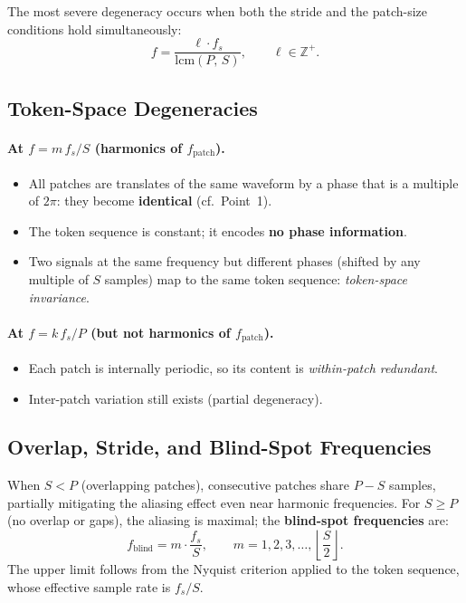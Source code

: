 The most severe degeneracy occurs when both the stride and the patch-size conditions hold
simultaneously:
\begin{equation}
    f = \frac{\ell \cdot f_s}{\mathrm{lcm}(P,\, S)},
    \qquad \ell \in \mathbb{Z}^+.
\end{equation}

\subsection{Token-Space Degeneracies}

\paragraph{At $f = m\,f_s/S$ (harmonics of $f_{\mathrm{patch}}$).}
\begin{itemize}
    \item All patches are translates of the same waveform by a phase that is a multiple of
          $2\pi$: they become \textbf{identical} (cf.\ Point~1).
    \item The token sequence is constant; it encodes \textbf{no phase information}.
    \item Two signals at the same frequency but different phases (shifted by any multiple of
          $S$ samples) map to the same token sequence: \emph{token-space invariance}.
\end{itemize}

\paragraph{At $f = k\,f_s/P$ (but not harmonics of $f_{\mathrm{patch}}$).}
\begin{itemize}
    \item Each patch is internally periodic, so its content is \emph{within-patch redundant}.
    \item Inter-patch variation still exists (partial degeneracy).
\end{itemize}

\subsection{Overlap, Stride, and Blind-Spot Frequencies}

When $S < P$ (overlapping patches), consecutive patches share $P - S$ samples, partially
mitigating the aliasing effect even near harmonic frequencies.  For $S \geq P$ (no overlap
or gaps), the aliasing is maximal; the \textbf{blind-spot frequencies} are:
\begin{equation}
    \boxed{f_{\mathrm{blind}} = m \cdot \frac{f_s}{S},
    \qquad m = 1, 2, 3, \ldots, \left\lfloor \frac{S}{2} \right\rfloor.}
\end{equation}
The upper limit follows from the Nyquist criterion applied to the token sequence, whose
effective sample rate is $f_s/S$.

